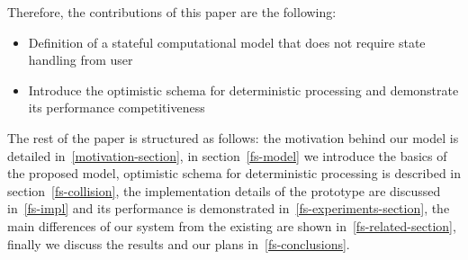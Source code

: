 Therefore, the contributions of this paper are the following:

\begin {itemize}
\item Definition of a stateful computational model that does not require state handling from user
\item Introduce the optimistic schema for deterministic processing and demonstrate its performance competitiveness
\end {itemize}

The rest of the paper is structured as follows: the motivation behind our model is detailed in~\ref{motivation-section}, in section~\ref{fs-model} we introduce the basics of the proposed model, optimistic schema for deterministic processing is described in section~\ref{fs-collision}, the implementation details of the prototype are discussed in~\ref{fs-impl} and its performance is demonstrated in~\ref{fs-experiments-section}, the main differences of our system from the existing are shown in~\ref{fs-related-section}, finally we discuss the results and our plans in~\ref{fs-conclusions}.

\endinput
